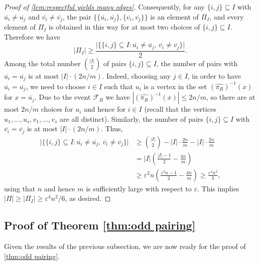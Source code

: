 \documentclass[11pt,reqno,oneside]{amsart}
\theoremstyle{definition}
\newcommand\ol[1]{\overline{#1}}
\newcommand\wh[1]{\widehat{#1}}
\newcommand\1{\mathbf{1}}
\newcommand{\su}{\subseteq}
\newcommand{\eps}{\varepsilon}
\let\leq\leqslant
\let\geq\geqslant
\begin{document}
\begin{proof}[Proof of \cref{lem:respectful yields many edges}]
Consequently, for any $\{i,j\}\su I$ with
$\ol{u_i}\ne\ol{u_j}$ and $\ol{v_i}\ne\ol{v_j}$, the pair
$\{\{\ol{u_i},\ol{u_j}\}, \{\ol{v_i},\ol{v_j}\}\}$
is an element of $\Pi_I$, and every element of $\Pi_I$ is obtained in this
way for at most two choices of $\{i,j\}\su I$.
Therefore we have
\[
|\Pi_I| \geq \frac{ \big| \big\{\{i,j\}\su I : \ol{u_i}\ne\ol{u_j},\, \ol{v_i}\ne\ol{v_j} \big\} \big|
}{2}.
\]
Among the total number $\binom{|I|}{2}$ of pairs $\{i,j\}\su I$,
the number of pairs with $\ol{u_i}=\ol{u_j}$ is at most
$|I|\cdot (2n/m)$.
Indeed, choosing any $j\in I$, in order to have $\ol{u_i}=\ol{u_j}$,
we need to choose $i\in I$ such that $u_i$ is a vertex in the set
$(\wh{\pi_R})^{-1}(x)$ for $x=\ol{u_j}$.
Due to the event $\mathcal F_R$ we have
$|(\wh{\pi_R})^{-1}(x)|\leq 2n/m$, so there are at most $2n/m$ choices for $u_i$
and hence for $i\in I$
(recall that the vertices $u_1,\dots,u_s,v_1,\dots,v_s$ are all distinct).
Similarly, the number of pairs $\{i,j\}\su I$ with
$\ol{v_i}=\ol{v_j}$ is at most $|I|\cdot (2n/m)$.
Thus,
\begin{align*}
\big|
\big\{\{i,j\}\su I :
\ol{u_i}\ne\ol{u_j},\,
\ol{v_i}\ne\ol{v_j}
\big\}
\big|
&\geq
\binom{|I|}{2}
- |I|\cdot \frac{2n}{m}
- |I|\cdot \frac{2n}{m} \\
&=
|I|\left(\frac{|I|-1}{2}-\frac{4n}{m}\right) \\
&\geq
\eps^2 n
\left(\frac{\eps^2 n-1}{2}-\frac{4n}{m}\right)
\geq
\frac{\eps^4 n^2}{3},
\end{align*}
using that $n$ and hence $m$ is sufficiently large with respect to $\eps$.
This implies
$|\Pi|\geq |\Pi_I|\geq \eps^4 n^2/6$, as desired.
\end{proof}



\subsection{Proof of Theorem \ref{thm:odd pairing}}
Given the results of the previous subsection, we are now ready for the proof of \cref{thm:odd pairing}. 
\end{document}

